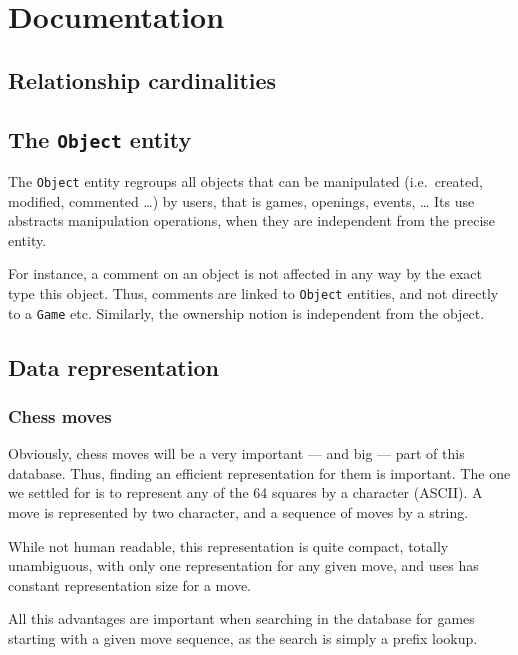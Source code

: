 \documentclass{article}
\begin{document}
\section{Documentation}
\subsection{}

\subsection{Relationship cardinalities}

\subsection{The \texttt{Object} entity}
The \verb|Object| entity regroups all objects that can be manipulated (i.e.\ created, modified, commented \dots) by users,
that is games, openings, events, \dots
Its use abstracts manipulation operations, when they are independent from the precise entity.

For instance, a comment on an object is not affected in any way by the exact type this object.
Thus, comments are linked to \verb|Object| entities, and not directly to a \verb|Game| etc.
Similarly, the ownership notion is independent from the object.

\subsection{Data representation}
\subsubsection{Chess moves}
Obviously, chess moves will be a very important --- and big --- part of this database.
Thus, finding an efficient representation for them is important.
The one we settled for is to represent any of the 64 squares by a character (ASCII).
A move is represented by two character, and a sequence of moves by a string.

While not human readable, this representation is quite compact, totally unambiguous,
with only one representation for any given move, and uses has constant representation
size for a move.

All this advantages are important when searching in the database for games starting
with a given move sequence, as the search is simply a prefix lookup.
\end{document}
